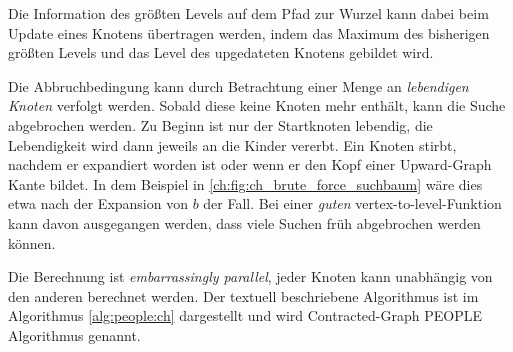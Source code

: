 Die Information des größten Levels auf dem Pfad zur Wurzel kann dabei beim Update eines Knotens übertragen werden, indem das Maximum des bisherigen größten Levels und das Level des upgedateten Knotens gebildet wird.


Die Abbruchbedingung kann durch Betrachtung einer Menge an \emph{lebendigen Knoten} verfolgt werden.
Sobald diese keine Knoten mehr enthält, kann die Suche abgebrochen werden.
Zu Beginn ist nur der Startknoten lebendig, die Lebendigkeit wird dann jeweils an die Kinder vererbt.
Ein Knoten stirbt, nachdem er expandiert worden ist oder wenn er den Kopf einer Upward-Graph Kante bildet.
In dem Beispiel in \autoref{ch:fig:ch_brute_force_suchbaum} wäre dies etwa nach der Expansion von $b$ der Fall.
Bei einer \emph{guten} vertex-to-level-Funktion kann davon ausgegangen werden, dass viele Suchen früh abgebrochen werden können.

Die Berechnung ist \emph{embarrassingly parallel}, jeder Knoten kann unabhängig von den anderen berechnet werden.
Der textuell beschriebene Algorithmus ist im Algorithmus \ref{alg:people:ch} dargestellt und wird Contracted-Graph PEOPLE Algorithmus genannt.

